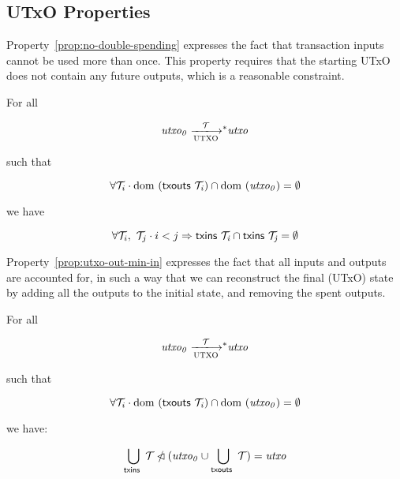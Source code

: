 \subsection{UTxO Properties}
\label{sec:utxo-properties}

Property~\ref{prop:no-double-spending} expresses the fact that transaction
inputs cannot be used more than once. This property requires that the starting
UTxO does not contain any future outputs, which is a reasonable constraint.

\begin{prop}\label{prop:no-double-spending}
  For all

  $$\var{utxo_0} \transtar{UTXO}{\txs} \var{utxo}$$

  such that

  $$
    \forall \mathcal{T}_i \cdot \operatorname{dom}~(\mathsf{txouts}~ \mathit{\mathcal{T}_i}) \cap \operatorname{dom}~(\mathit{utxo_0}) = \emptyset
  $$

  we have

  $$
  \forall \mathcal{T}_i,~\mathcal{T}_j \cdot i < j \Rightarrow \mathsf{txins}~ \mathit{\mathcal{T}_i} \cap \mathsf{txins}~ \mathit{\mathcal{T}_j} = \emptyset
  $$
\end{prop}

Property~\ref{prop:utxo-out-min-in} expresses the fact that all inputs and
outputs are accounted for, in such a way that we can reconstruct the final
(UTxO) state by adding all the outputs to the initial state, and removing the
spent outputs.

\begin{prop}\label{prop:utxo-out-min-in}
  For all

  $$\var{utxo_0} \transtar{UTXO}{\txs} \var{utxo}$$

  such that

  $$
    \forall \mathcal{T}_i \cdot \operatorname{dom}~(\mathsf{txouts}~ \mathit{\mathcal{T}_i}) \cap \operatorname{dom}~(\mathit{utxo_0}) = \emptyset
  $$

  we have:

  $$
  \bigcup_{\mathsf{txins}~ \mathit{}} \mathcal{T} \mathbin{\slashed{\lhd}} (\mathit{utxo_0} \cup \bigcup_{\mathsf{txouts}~ \mathit{}} \mathcal{T}) = \mathit{utxo}
  $$

\end{prop}
